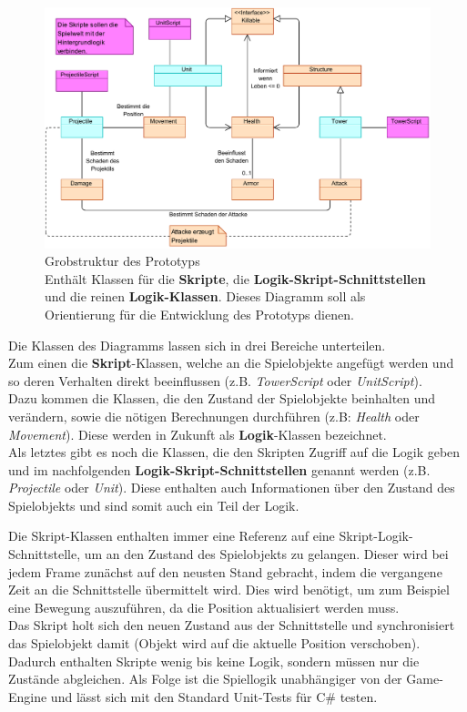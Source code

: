 \begin{figure}[h]
\centering
\includegraphics[width=1\linewidth]{./images/Kapitel_PrototypKonzept/Grobstruktur.pdf}
\caption[Grobstruktur des Prototyps]{Grobstruktur des Prototyps\\
Enthält Klassen für die \textbf{\textcolor{ScriptClass}{Skripte}}, die \textbf{\textcolor{ScriptLogicInterface}{Logik-Skript-Schnittstellen}} und die reinen \textbf{\textcolor{LogicClass}{Logik-Klassen}}.
Dieses Diagramm soll als Orientierung für die Entwicklung des Prototyps dienen.}
\label{fig:Grobstruktur}
\end{figure}

Die Klassen des Diagramms lassen sich in drei Bereiche unterteilen.\\
Zum einen die \textbf{\textcolor{ScriptClass}{Skript}}-Klassen, welche an die Spielobjekte angefügt werden und so deren Verhalten direkt beeinflussen (z.B. \textit{TowerScript} oder \textit{UnitScript}).\\
Dazu kommen die Klassen, die den Zustand der Spielobjekte beinhalten und verändern, sowie die nötigen Berechnungen durchführen (z.B: \textit{Health} oder \textit{Movement}). Diese werden in Zukunft als \textbf{\textcolor{LogicClass}{Logik}}-Klassen bezeichnet.\\
Als letztes gibt es noch die Klassen, die den Skripten Zugriff auf die Logik geben und im nachfolgenden \textbf{\textcolor{ScriptLogicInterface}{Logik-Skript-Schnittstellen}} genannt werden (z.B. \textit{Projectile} oder \textit{Unit}). Diese enthalten auch Informationen über den Zustand des Spielobjekts und sind somit auch ein Teil der Logik.

Die Skript-Klassen enthalten immer eine Referenz auf eine Skript-Logik-Schnittstelle, um an den Zustand des Spielobjekts zu gelangen. Dieser wird bei jedem Frame zunächst auf den neusten Stand gebracht, indem die vergangene Zeit an die Schnittstelle übermittelt wird. Dies wird benötigt, um zum Beispiel eine Bewegung auszuführen, da die Position aktualisiert werden muss.\\
Das Skript holt sich den neuen Zustand aus der Schnittstelle und synchronisiert das Spielobjekt damit (Objekt wird auf die aktuelle Position verschoben). Dadurch enthalten Skripte wenig bis keine Logik, sondern müssen nur die Zustände abgleichen. Als Folge ist die Spiellogik unabhängiger von der Game-Engine und lässt sich mit den Standard Unit-Tests für C\# testen.

